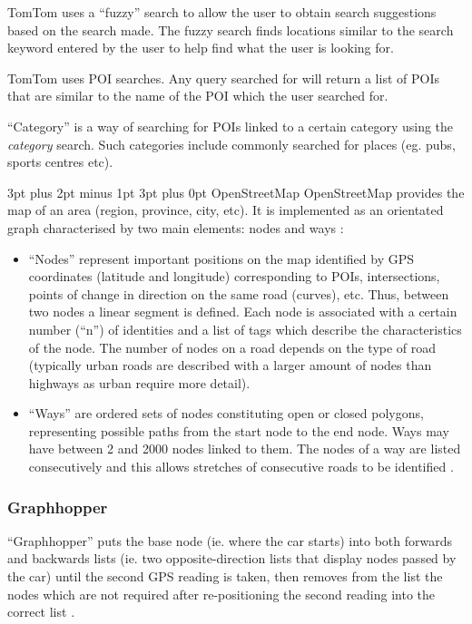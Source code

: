 \documentclass[12pt,a4paper]{article}
\makeatletter
\renewcommand\subsection{\@startsection {subsection}{1}{0mm} %
                               {3pt plus 2pt minus 1pt} %
                               {3pt plus 0pt} %
                               {\normalfont\bfseries}}
\makeatother
\begin{document}
TomTom uses a \enquote{fuzzy} search to allow the user to obtain search suggestions based on the search made. The fuzzy search finds locations similar to the search keyword entered by the user to help find what the user is looking for. 

TomTom uses POI searches. Any query searched for will return a list of POIs that are similar to the name of the POI which the user searched for.

\enquote{Category} is a way of searching for POIs linked to a certain category using the \textit{category} search. Such categories include commonly searched for places (eg. pubs, sports centres etc).

\subsection{OpenStreetMap}
OpenStreetMap provides the map of an area (region, province, city, etc). It is implemented as an orientated graph characterised by two main elements: nodes and ways \cite{OpenWiki}:

\begin{itemize}
	\item \enquote{Nodes} represent important positions on the map identified by GPS coordinates (latitude and longitude) corresponding to POIs, intersections, points of change in direction on the same road (curves), etc. Thus, between two nodes a linear segment is defined. Each node is associated with a certain number (\enquote{n}) of identities and a list of tags which describe the characteristics of the node. The number of nodes on a road depends on the type of road (typically urban roads are described with a larger amount of nodes than highways as urban require more detail)\cite{OpenWiki}.
	
	\item \enquote{Ways} are ordered sets of nodes constituting open or closed polygons, representing possible paths from the start node to the end node. Ways may have between 2 and 2000 nodes linked to them. The nodes of a way are listed consecutively and this allows  stretches of consecutive roads to be identified \cite{OpenWiki}.
	
	
\end{itemize}

\subsubsection{Graphhopper}
\enquote{Graphhopper} puts the base node (ie. where the car starts) into both forwards and backwards lists (ie. two opposite-direction lists that display nodes passed by the car) until the second GPS reading is taken, then removes from the list the nodes which are not required after re-positioning the second reading into the correct list \cite{DAndrea2017}. 
\end{document}
